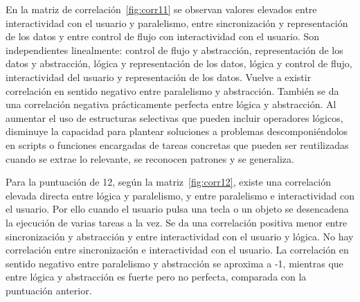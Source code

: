 \documentclass[a4paper, 12pt]{book}
\begin{document}
En la matriz de correlación~\ref{fig:corr11} se observan valores elevados entre interactividad con el usuario y paralelismo, entre sincronización y representación de los datos y entre control de flujo con interactividad con el usuario. Son independientes linealmente: control de flujo y abstracción, representación de los datos y abstracción, lógica y representación de los datos, lógica y control de flujo, interactividad del usuario y representación de los datos. Vuelve a existir correlación en sentido negativo entre paralelismo y abstracción. También se da una correlación negativa prácticamente perfecta entre lógica y abstracción. Al aumentar el uso de estructuras selectivas que pueden incluir operadores lógicos, disminuye la capacidad para plantear soluciones a problemas descomponiéndolos en scripts o funciones encargadas de tareas concretas que pueden ser reutilizadas cuando se extrae lo relevante, se reconocen patrones y se generaliza. %

Para la puntuación de 12, según la matriz~\ref{fig:corr12}, existe una correlación elevada directa entre lógica y paralelismo, y entre paralelismo e interactividad con el usuario. Por ello cuando el usuario pulsa una tecla o un objeto se desencadena la ejecución de varias tareas a la vez. Se da una correlación positiva menor entre sincronización y abstracción y entre interactividad con el usuario y lógica. No hay correlación entre sincronización e interactividad con el usuario. La correlación en sentido negativo entre paralelismo y abstracción se aproxima a -1, mientras que entre lógica y abstracción es fuerte pero no perfecta, comparada con la puntuación anterior. 
\end{document}

